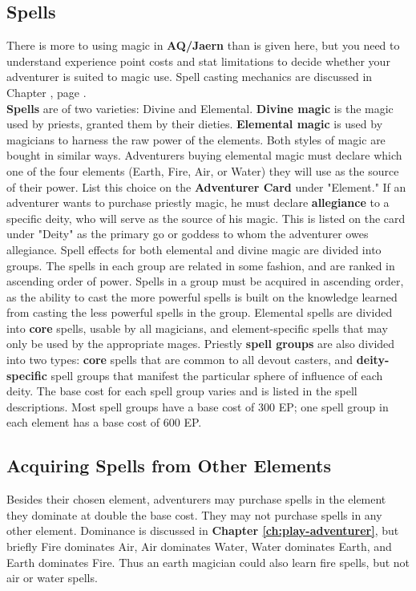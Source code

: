 \begin{multicols*}{2}
\section{Spells}
There is more to using magic in \textbf{AQ/Jaern} than is given here, but you need to understand experience point costs
and stat limitations to decide whether your adventurer is suited to magic use. Spell casting mechanics are discussed in Chapter \textbf{}, page \textbf{\pageref{ch:play-adventurer}}.\\
\textbf{Spells} are of two varieties: Divine and Elemental. \textbf{Divine magic} is the magic used by priests, granted them by their dieties. \textbf{Elemental magic} is used by magicians to harness the raw power of the elements. Both styles of magic
are bought in similar ways.
Adventurers buying elemental magic must declare which one of the four elements (Earth, Fire, Air, or Water) they will use as the source of their power. List this choice on the \textbf{Adventurer Card} under "Element."
If an adventurer wants to purchase priestly magic, he must declare \textbf{allegiance} to a specific deity, who will serve as the source of his magic. This is listed on the card under "Deity" as the primary go or goddess to whom the adventurer owes allegiance.
Spell effects for both elemental and divine magic are divided into groups. The spells in each group are related in some fashion, and are ranked in ascending order of power.
Spells in a group must be acquired in ascending order, as the ability to cast the more powerful spells is built on the knowledge learned from casting the less powerful spells in the group.
Elemental spells are divided into \textbf{core} spells, usable by all magicians, and element-specific spells that may only be used by the appropriate mages.
Priestly \textbf{spell groups} are also divided into two types: \textbf{core} spells that are common to all devout casters, and \textbf{deity-specific} spell groups that manifest the particular sphere of influence of each deity.
The base cost for each spell group varies and is listed in the spell descriptions. Most spell groups have a base cost of 300 EP; one spell group in each element has a base
cost of 600 EP.
\subsection{Acquiring Spells from Other Elements}
Besides their chosen element, adventurers may purchase spells in the element they dominate at double the base cost. They may not purchase spells in any other element.
Dominance is discussed in \textbf{Chapter \ref{ch:play-adventurer}}, but briefly Fire dominates Air, Air dominates Water, Water dominates Earth, and Earth dominates Fire. Thus an earth magician could also learn fire spells, but not air or water spells.

\end{multicols*}
